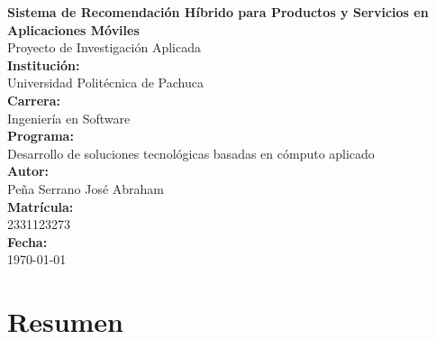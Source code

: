 \documentclass[11pt, letterpaper]{article}
\begin{document}
	
	\begin{titlepage}
		\centering
		\vspace*{2cm}
		
		{\Huge \textbf{Sistema de Recomendación Híbrido para Productos y Servicios en Aplicaciones Móviles}} \\[0.5cm]
		{\Large Proyecto de Investigación Aplicada} \\[2cm]
		
		
		
		\textbf{Institución:}\\
		Universidad Politécnica de Pachuca \\[0.5cm]
		
		\textbf{Carrera:}\\
		Ingeniería en Software \\[0.5cm]
		
		\textbf{Programa:}\\
		Desarrollo de soluciones tecnológicas basadas en cómputo aplicado \\[0.5cm]
		
		\textbf{Autor:}\\
		Peña Serrano José Abraham \\[0.5cm]
		
		\textbf{Matrícula:}\\
		2331123273 \\[1.0cm]
		
		\textbf{Fecha:}\\
		\today \\[2cm]
		
		\vfill
	\end{titlepage}
	
	\tableofcontents
	\listoftables
	\listoffigures
	\newpage
	
	\section*{Resumen}
	
\end{document}
